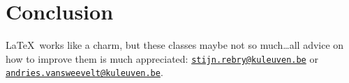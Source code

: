 \documentclass[a4paper,kulak]{kulakarticle} %
\begin{document}
\section*{Conclusion}

\LaTeX\ works like a charm, but these classes maybe not so much\ldots all advice on how to improve them is much appreciated: \href{mailto:stijn.rebry@kuleuven.be}{\texttt{stijn.rebry@kuleuven.be}} or \href{mailto:andries.vansweevelt@kuleuven.be}{\texttt{andries.vansweevelt@kuleuven.be}}.
\end{document}
